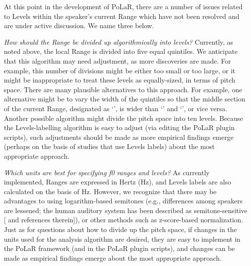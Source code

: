 At this point in the development of PoLaR, there are a number of issues related to Levels within the speaker’s current Range which have not been resolved and are under active discussion.  We name three below.

\textit{How should the Range be divided up algorithmically into levels?} Currently, as noted above, the local Range is divided into five equal quintiles. We anticipate that this algorithm may need adjustment, as more discoveries are made. For example, this number of divisions might be either too small or too large, or it might be inappropriate to treat these levels as equally-sized, in terms of pitch space. There are many plausible alternatives to this approach. For example, one alternative might be to vary the width of the quintiles so that the middle section of the current Range, designated as ‘’, is wider than ‘’ and ‘’, or vice versa. Another possible algorithm might divide the pitch space into ten levels. Because the Levels-labelling algorithm is easy to adjust (via editing the PoLaR plugin scripts), such adjustments should be made as more empirical findings emerge (perhaps on the basis of studies that use Levels labels) about the most appropriate approach.

\textit{Which units are best for specifying f0 ranges and levels?} As currently implemented, Ranges are expressed in Hertz (Hz), and Levels labels are also calculated on the basis of Hz. However, we recognize that there may be advantages to using logarithm-based semitones (e.g., differences among speakers are lessened; the human auditory system has been described as semitone-sensitive [\citealt{nolan03} and references therein]), or other methods such as z-score-based normalization. Just as for questions about how to divide up the pitch space, if changes in the units used for the analysis algorithm are desired, they are easy to implement in the PoLaR framework (and in the PoLaR plugin scripts), and changes can be made as empirical findings emerge about the most appropriate approach.

